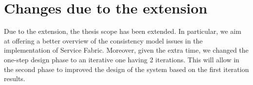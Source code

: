 \section{Changes due to the extension}
Due to the extension, the thesis scope has been extended. In particular, we aim at offering a better overview of the consistency model issues in the implementation of Service Fabric. Moreover, given the extra time, we changed the one-step design phase to an iterative one having 2 iterations. This will allow in the second phase to improved the design of the system based on the first iteration results.

